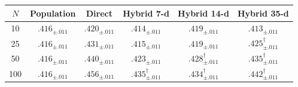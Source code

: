 \begin{tabular}{@{}c cc ccc@{}}
\toprule
$N$ & Population & Direct & Hybrid 7-d & Hybrid 14-d & Hybrid 35-d \\
\midrule
10 & $.416_{\pm .011}$ & $.420_{\pm .011}$ & $.414_{\pm .011}$ & $.419_{\pm .011}$ & $.413_{\pm .011}$ \\
25 & $.416_{\pm .011}$ & $.431_{\pm .011}$ & $.415_{\pm .011}$ & $.419_{\pm .011}$ & $.425_{\pm .011}^{\dagger}$ \\
50 & $.416_{\pm .011}$ & $.440_{\pm .011}$ & $.423_{\pm .011}$ & $.428_{\pm .011}^{\dagger}$ & $.435_{\pm .011}^{\dagger}$ \\
100 & $.416_{\pm .011}$ & $.456_{\pm .011}$ & $.435_{\pm .011}^{\dagger}$ & $.434_{\pm .011}^{\dagger}$ & $.442_{\pm .011}^{\dagger}$ \\
\bottomrule
\end{tabular}

